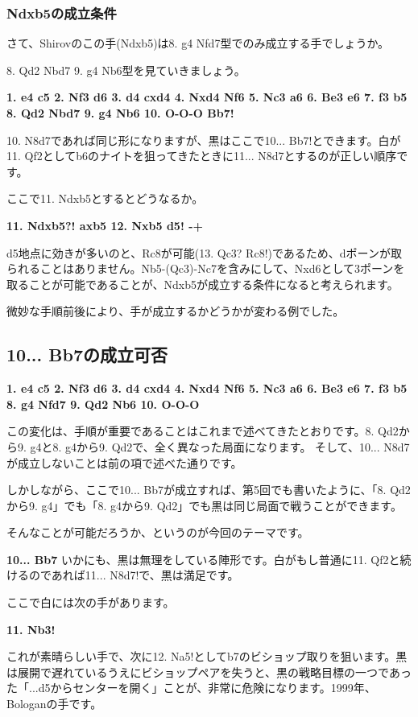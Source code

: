 \subsubsection{Ndxb5の成立条件}
さて、Shirovのこの手(Ndxb5)は8. g4 Nfd7型でのみ成立する手でしょうか。

8. Qd2 Nbd7 9. g4 Nb6型を見ていきましょう。

{\bf 1. e4 c5 2. Nf3 d6 3. d4 cxd4 4. Nxd4 Nf6 5. Nc3 a6 6. Be3 e6 7. f3 b5 8. Qd2 Nbd7 9. g4 Nb6 10. O-O-O Bb7!}

10. N8d7であれば同じ形になりますが、黒はここで10... Bb7!とできます。白が11. Qf2としてb6のナイトを狙ってきたときに11... N8d7とするのが正しい順序です。

ここで11. Ndxb5とするとどうなるか。

{\bf 11. Ndxb5?! axb5 12. Nxb5 d5! -+}

d5地点に効きが多いのと、Rc8が可能(13. Qc3? Rc8!)であるため、dポーンが取られることはありません。Nb5-(Qc3)-Nc7を含みにして、Nxd6として3ポーンを取ることが可能であることが、Ndxb5が成立する条件になると考えられます。

微妙な手順前後により、手が成立するかどうかが変わる例でした。

\subsection{10... Bb7の成立可否}
{\bf 1. e4 c5 2. Nf3 d6 3. d4 cxd4 4. Nxd4 Nf6 5. Nc3 a6 6. Be3 e6 7. f3 b5 8. g4 Nfd7 9. Qd2 Nb6 10. O-O-O}

この変化は、手順が重要であることはこれまで述べてきたとおりです。8. Qd2から9. g4と8. g4から9. Qd2で、全く異なった局面になります。
そして、10... N8d7が成立しないことは前の項で述べた通りです。

しかしながら、ここで10... Bb7が成立すれば、第5回でも書いたように、「8. Qd2から9. g4」でも「8. g4から9. Qd2」でも黒は同じ局面で戦うことができます。

そんなことが可能だろうか、というのが今回のテーマです。

{\bf 10... Bb7}
いかにも、黒は無理をしている陣形です。白がもし普通に11. Qf2と続けるのであれば11... N8d7!で、黒は満足です。

ここで白には次の手があります。

{\bf 11. Nb3!}

これが素晴らしい手で、次に12. Na5!としてb7のビショップ取りを狙います。黒は展開で遅れているうえにビショップペアを失うと、黒の戦略目標の一つであった「...d5からセンターを開く」ことが、非常に危険になります。1999年、Bologanの手です。

